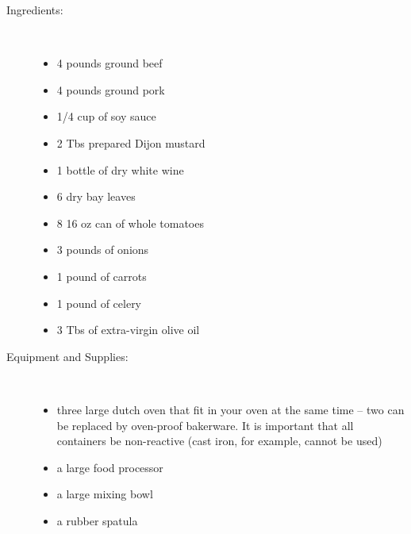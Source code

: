 \documentclass[11pt,letterpaper]{article}
\begin{document}
\begin{description}

\item[Ingredients:]\ \\
	\begin{itemize}
	\item 4 pounds ground beef
	\item 4 pounds ground pork
	\item 1/4 cup of soy sauce
	\item 2 Tbs prepared Dijon mustard
	\item 1 bottle of dry white wine
	\item 6 dry bay leaves
	\item 8 16 oz can of whole tomatoes
	\item 3 pounds of onions
	\item 1 pound of carrots
	\item 1 pound of celery
	\item 3 Tbs of extra-virgin olive oil
	\end{itemize}
\item[Equipment and Supplies:]\ \\
	\begin{itemize}
	\item three large dutch oven that fit in your oven at the same time -- two can be replaced by oven-proof bakerware. It is important that all containers be non-reactive (cast iron, for example, cannot be used)
	\item a large food processor
	\item a large mixing bowl
	\item a rubber spatula
	\end{itemize}


\end{description}
\end{document}
